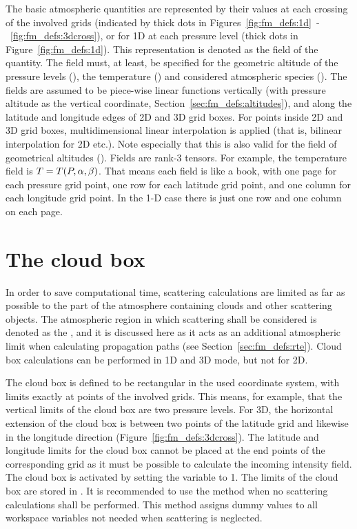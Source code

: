 The basic atmospheric quantities are represented by their values at
each crossing of the involved grids (indicated by thick dots in
Figures~\ref{fig:fm_defs:1d}~-~\ref{fig:fm_defs:3dcross}), or for 1D
at each pressure level (thick dots in Figure~\ref{fig:fm_defs:1d}).
This representation is denoted as the field
of the quantity. The field must, at least, be specified for the
geometric altitude of the pressure levels (), the
temperature () and considered atmospheric species
().  The fields are assumed to be piece-wise
linear functions vertically (with pressure altitude as the vertical
coordinate, Section~\ref{sec:fm_defs:altitudes}), and along the
latitude and longitude edges of 2D and 3D grid boxes. For points
inside 2D and 3D grid boxes, multidimensional linear interpolation is
applied (that is, bilinear interpolation for 2D etc.). Note especially
that this is also valid for the field of geometrical altitudes
(). Fields are rank-3 tensors. For example, the
temperature field is $T=T(P,\alpha,\beta)$. That means each field is
like a book, with one page for each pressure grid point, one row for
each latitude grid point, and one column for each longitude grid
point. In the 1-D case there is just one row and one column on each
page.



\section{The cloud box}
\label{sec:fm_defs:cloudbox}

In order to save computational time, scattering calculations are
limited as far as possible to the part of the atmosphere containing
clouds and other scattering objects. The atmospheric region in which
scattering shall be considered is denoted as the , and it is discussed here as it acts as an additional
atmospheric limit when calculating propagation paths (see
Section~\ref{sec:fm_defs:rte}). Cloud box calculations can be
performed in 1D and 3D mode, but not for 2D.

The cloud box is defined to be rectangular in the used coordinate
system, with limits exactly at points of the involved grids. This
means, for example, that the vertical limits of the cloud box are two
pressure levels. For 3D, the horizontal extension of the cloud box
is between two points of the latitude grid and likewise in the
longitude direction (Figure~\ref{fig:fm_defs:3dcross}). The latitude
and longitude limits for the cloud box cannot be placed at the end
points of the corresponding grid as it must be possible to calculate
the incoming intensity field. The cloud box is activated by setting
the variable  to 1.  The limits of the cloud
box are stored in .  It is recommended to
use the method  when no scattering calculations
shall be performed. This method assigns dummy values to all workspace
variables not needed when scattering is neglected.


